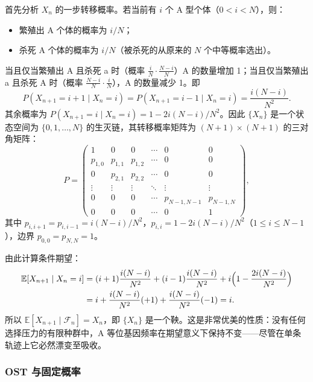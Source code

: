 首先分析 $X_n$ 的一步转移概率。若当前有 $i$ 个 A 型个体（$0 < i < N$），则：
\begin{itemize}[noitemsep]
  \item 繁殖出 A 个体的概率为 $i/N$；
  \item 杀死 A 个体的概率为 $i/N$（被杀死的从原来的 $N$ 个中等概率选出）。
\end{itemize}
当且仅当繁殖出 A 且杀死 a 时（概率 $\frac{i}{N} \cdot \frac{N-i}{N}$）A 的数量增加 1；当且仅当繁殖出 a 且杀死 A 时（概率 $\frac{N-i}{N} \cdot \frac{i}{N}$），A 的数量减少 1。即
\begin{equation}\label{eq:moran_trans}
  P(X_{n+1} = i+1 \mid X_n = i)
  = P(X_{n+1} = i-1 \mid X_n = i)
  = \frac{i(N-i)}{N^2}.
\end{equation}
其余概率为 $P(X_{n+1} = i \mid X_n = i) = 1 - 2i(N-i)/N^2$。因此 $\{X_n\}$ 是一个状态空间为 $\{0,1,\dots,N\}$ 的生灭链，其转移概率矩阵为 $(N+1) \times (N+1)$ 的三对角矩阵：
\begin{equation}\label{eq:moran_P}
  P = \begin{pmatrix}
    1 & 0 & 0 & \cdots & 0 & 0 \\
    p_{1,0} & p_{1,1} & p_{1,2} & \cdots & 0 & 0 \\
    0 & p_{2,1} & p_{2,2} & \cdots & 0 & 0 \\
    \vdots & \vdots & \vdots & \ddots & \vdots & \vdots \\
    0 & 0 & 0 & \cdots & p_{N-1,N-1} & p_{N-1,N} \\
    0 & 0 & 0 & \cdots & 0 & 1
  \end{pmatrix},
\end{equation}
其中 $p_{i,i+1} = p_{i,i-1} = i(N-i)/N^2$，$p_{i,i} = 1 - 2i(N-i)/N^2$（$1 \leqslant i \leqslant N-1$），边界 $p_{0,0} = p_{N,N} = 1$。

由此计算条件期望：
\begin{align}
  \mathbb{E}[X_{n+1} \mid X_n = i]
  &= (i+1) \frac{i(N-i)}{N^2} + (i-1) \frac{i(N-i)}{N^2}
   + i \Big(1 - \frac{2i(N-i)}{N^2}\Big) \notag\\
  &= i + \frac{i(N-i)}{N^2}(+1) + \frac{i(N-i)}{N^2}(-1) = i. \label{eq:moran_mg}
\end{align}
所以 $\mathbb{E}[X_{n+1} \mid \mathcal{F}_n] = X_n$，即 $\{X_n\}$ 是一个鞅。这是非常优美的性质：没有任何选择压力的有限种群中，A 等位基因频率在期望意义下保持不变——尽管在单条轨迹上它必然漂变至吸收。

\subsubsection{OST 与固定概率}

